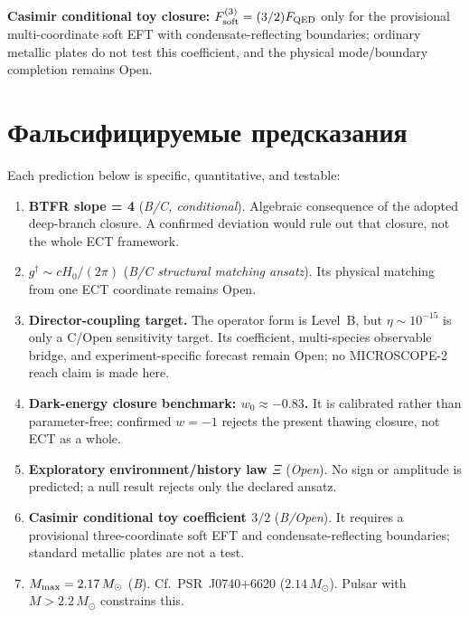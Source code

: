 \documentclass[11pt,a4paper]{article}
\begin{document}
\textbf{Casimir conditional toy closure:}
$F_{\rm soft}^{(3)}=(3/2)F_{\rm QED}$ only for the provisional multi-coordinate soft EFT with condensate-reflecting boundaries; ordinary metallic plates do not test this coefficient, and the physical mode/boundary completion remains Open.


\section{Фальсифицируемые предсказания}
\label{sec:pop_predictions}

Each prediction below is specific, quantitative, and testable:

\begin{enumerate}
\item \textbf{BTFR slope = 4} (\emph{B/C, conditional}). Algebraic consequence of the adopted deep-branch closure. A confirmed deviation would rule out that closure, not the whole ECT framework.

\item \textbf{$g^\dagger \sim cH_0/(2\pi)$} (\emph{B/C structural matching ansatz}). Its physical matching from one ECT coordinate remains Open.

\item \textbf{Director-coupling target.} The operator form is Level~B, but $\eta\sim10^{-15}$ is only a C/Open sensitivity target. Its coefficient, multi-species observable bridge, and experiment-specific forecast remain Open; no MICROSCOPE-2 reach claim is made here.

\item \textbf{Dark-energy closure benchmark: $w_0\approx-0.83$.} It is calibrated rather than parameter-free; confirmed $w=-1$ rejects the present thawing closure, not ECT as a whole.

\item \textbf{Exploratory environment/history law $\Xi$} (\emph{Open}). No sign or amplitude is predicted; a null result rejects only the declared ansatz.

\item \textbf{Casimir conditional toy coefficient $3/2$} (\emph{B/Open}). It requires a provisional three-coordinate soft EFT and condensate-reflecting boundaries; standard metallic plates are not a test.

\item \textbf{$M_{\rm max} = 2.17\,M_\odot$} (\emph{B}). Cf.\ PSR~J0740+6620 ($2.14\,M_\odot$). Pulsar with $M > 2.2\,M_\odot$ constrains this.


\end{enumerate}
\end{document}
